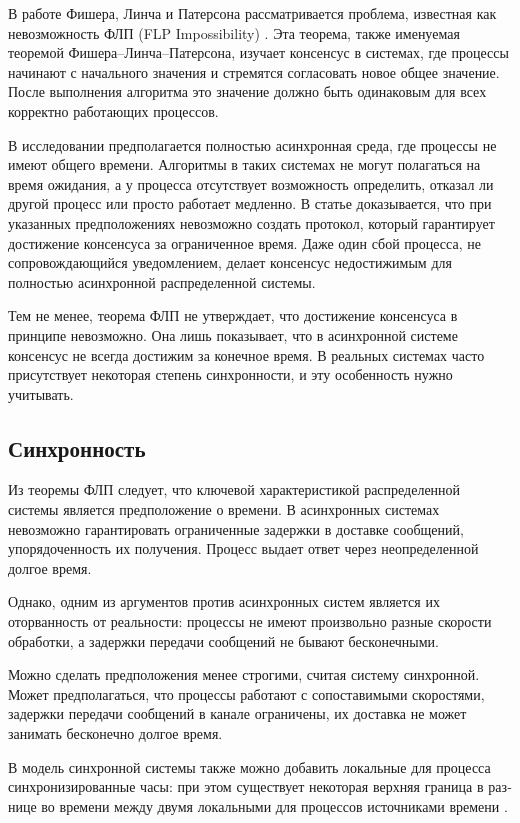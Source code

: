 В работе Фишера, Линча и Патерсона рассматривается проблема, известная как
невозможность ФЛП (FLP Impossibility) \cite{fischer85}. Эта теорема, также
именуемая теоремой Фишера–Линча–Патерсона, изучает консенсус в системах, где
процессы начинают с начального значения и стремятся согласовать новое общее
значение. После выполнения алгоритма это значение должно быть одинаковым для
всех корректно работающих процессов.

В исследовании предполагается полностью асинхронная среда, где процессы не
имеют общего времени. Алгоритмы в таких системах не могут полагаться
на время ожидания, а у процесса отсутствует возможность определить, отказал ли
другой процесс или просто работает медленно. В статье доказывается, что при
указанных предположениях невозможно создать протокол, который гарантирует
достижение консенсуса за ограниченное время. Даже один сбой процесса, не
сопровождающийся уведомлением, делает консенсус недостижимым для полностью
асинхронной распределенной системы.

Тем не менее, теорема ФЛП не утверждает, что достижение консенсуса в принципе
невозможно. Она лишь показывает, что в асинхронной системе консенсус не всегда
достижим за конечное время. В реальных системах часто присутствует некоторая
степень синхронности, и эту особенность нужно учитывать.

\subsection{Синхронность}

Из теоремы ФЛП следует, что ключевой характеристикой распределенной системы
является предположение о времени. В асинхронных системах невозможно
гарантировать ограниченные задержки в доставке сообщений, упорядоченность их
получения. Процесс выдает ответ через неопределенной долгое время.

Однако, одним из аргументов против асинхронных систем является их оторванность
от реальности: процессы не имеют произвольно разные скорости обработки, а
задержки передачи сообщений не бывают бесконечными.

Можно сделать предположения менее строгими, считая систему синхронной. Может
предполагаться, что процессы работают с сопоставимыми скоростями, задержки
передачи сообщений в канале ограничены, их доставка не может занимать
бесконечно долгое время.

В модель синхронной системы также можно добавить локальные для процесса
синхронизированные часы: при этом существует некоторая верхняя граница в раз­
нице во времени между двумя локальными для процессов источниками времени
\cite{cachin11}.

